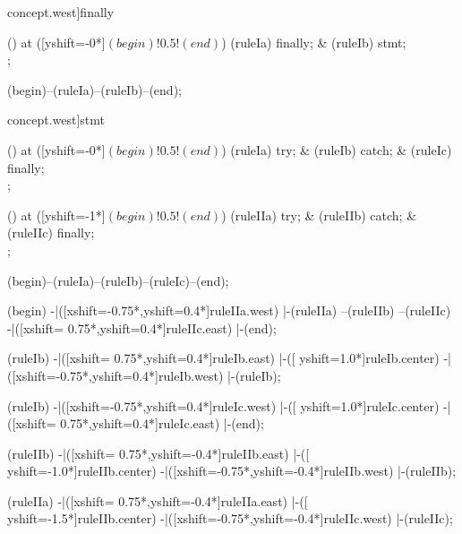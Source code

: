 \begin{syntax}[[xshift=22mm]concept.west]{finally}
  
  \node[sequence,column sep=2.0cm] () at ([yshift=-0*\syntaxruledist]$(begin)!0.5!(end)$) {
    \node[terminal]    (ruleIa) {finally};
    &
    \node[nonterminal] (ruleIb) {stmt};
    \\
  };
  
  \draw[path] (begin)--(ruleIa)--(ruleIb)--(end);
\end{syntax}

\begin{syntax}[[xshift=22mm]concept.west]{stmt}
  
  \node[sequence,column sep=2.0cm] () at ([yshift=-0*\syntaxruledist]$(begin)!0.5!(end)$) {
    \node[terminal]    (ruleIa) {try};
    &
    \node[nonterminal] (ruleIb) {catch};
    &
    \node[nonterminal] (ruleIc) {finally};
    \\
  };
  
  \node[sequence,column sep=2.0cm] () at ([yshift=-1*\syntaxruledist]$(begin)!0.5!(end)$) {
    \node[terminal]    (ruleIIa) {try};
    &
    \node[nonterminal] (ruleIIb) {catch};
    &
    \node[nonterminal] (ruleIIc) {finally};
    \\
  };
  
  \draw[path] (begin)--(ruleIa)--(ruleIb)--(ruleIc)--(end);
  
  \draw[path] (begin)
            -|([xshift=-0.75*\syntaxruledist,yshift=0.4*\syntaxruledist]ruleIIa.west)
            |-(ruleIIa)
            --(ruleIIb)
            --(ruleIIc)
            -|([xshift= 0.75*\syntaxruledist,yshift=0.4*\syntaxruledist]ruleIIc.east)
            |-(end);
  
  \draw[path] (ruleIb)
            -|([xshift= 0.75*\syntaxruledist,yshift=0.4*\syntaxruledist]ruleIb.east)
            |-([                             yshift=1.0*\syntaxruledist]ruleIb.center)
            -|([xshift=-0.75*\syntaxruledist,yshift=0.4*\syntaxruledist]ruleIb.west)
            |-(ruleIb);
  
  \draw[path] (ruleIb)
            -|([xshift=-0.75*\syntaxruledist,yshift=0.4*\syntaxruledist]ruleIc.west)
            |-([                             yshift=1.0*\syntaxruledist]ruleIc.center)
            -|([xshift= 0.75*\syntaxruledist,yshift=0.4*\syntaxruledist]ruleIc.east)
            |-(end);
  
  \draw[path] (ruleIIb)
            -|([xshift= 0.75*\syntaxruledist,yshift=-0.4*\syntaxruledist]ruleIIb.east)
            |-([                             yshift=-1.0*\syntaxruledist]ruleIIb.center)
            -|([xshift=-0.75*\syntaxruledist,yshift=-0.4*\syntaxruledist]ruleIIb.west)
            |-(ruleIIb);
  
  \draw[path] (ruleIIa)
            -|([xshift= 0.75*\syntaxruledist,yshift=-0.4*\syntaxruledist]ruleIIa.east)
            |-([                             yshift=-1.5*\syntaxruledist]ruleIIb.center)
            -|([xshift=-0.75*\syntaxruledist,yshift=-0.4*\syntaxruledist]ruleIIc.west)
            |-(ruleIIc);
\end{syntax}
